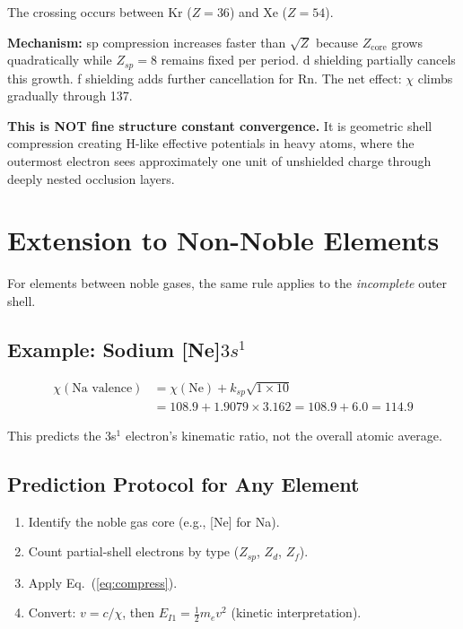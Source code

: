 The crossing occurs between Kr ($Z = 36$) and Xe ($Z = 54$).

\textbf{Mechanism:} sp compression increases faster than $\sqrt{Z}$ because $Z_{\text{core}}$ grows quadratically while $Z_{sp} = 8$ remains fixed per period.  d shielding partially cancels this growth.  f shielding adds further cancellation for Rn.  The net effect: $\chi$ climbs gradually through 137.

\textbf{This is NOT fine structure constant convergence.}  It is geometric shell compression creating H-like effective potentials in heavy atoms, where the outermost electron sees approximately one unit of unshielded charge through deeply nested occlusion layers.


\section{Extension to Non-Noble Elements}

For elements between noble gases, the same rule applies to the \emph{incomplete} outer shell.

\subsection{Example: Sodium [Ne]$3s^1$}

\begin{align}
  \chi(\text{Na valence}) &= \chi(\text{Ne}) + k_{sp}\sqrt{1 \times 10} \\
  &= 108.9 + 1.9079 \times 3.162 = 108.9 + 6.0 = 114.9
\end{align}

This predicts the 3s$^1$ electron's kinematic ratio, not the overall atomic average.

\subsection{Prediction Protocol for Any Element}

\begin{enumerate}
  \item Identify the noble gas core (e.g., [Ne] for Na).
  \item Count partial-shell electrons by type ($Z_{sp}$, $Z_d$, $Z_f$).
  \item Apply Eq.~(\ref{eq:compress}).
  \item Convert: $v = c/\chi$, then $E_{I1} = \tfrac{1}{2} m_e v^2$ (kinetic interpretation).
\end{enumerate}

